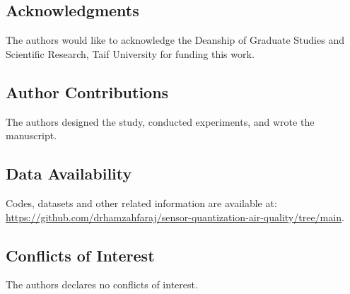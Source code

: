 \documentclass[12pt,a4paper]{article}
\begin{document}
\subsection*{Acknowledgments}
The authors would like to acknowledge the Deanship of Graduate Studies and Scientific Research, Taif University for funding this work.

\subsection*{Author Contributions}
The authors designed the study, conducted experiments, and wrote the manuscript.

\subsection*{Data Availability}
Codes, datasets and other related information are available at: \\ \url{https://github.com/drhamzahfaraj/sensor-quantization-air-quality/tree/main}.

\subsection*{Conflicts of Interest}
The authors declares no conflicts of interest.




\end{document}
